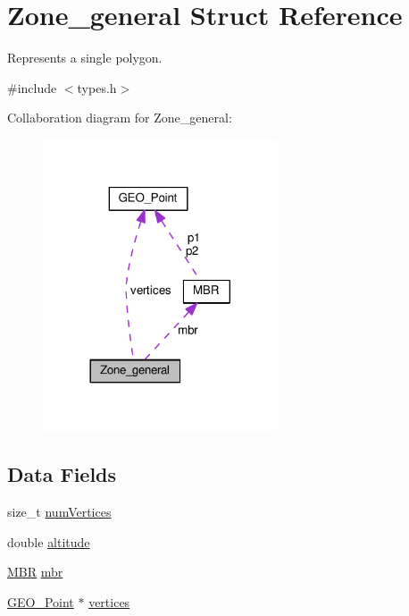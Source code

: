 \hypertarget{struct_zone__general}{}\section{Zone\+\_\+general Struct Reference}
\label{struct_zone__general}


Represents a single polygon.  




{\ttfamily \#include $<$types.\+h$>$}



Collaboration diagram for Zone\+\_\+general\+:
\nopagebreak
\begin{figure}[H]
\begin{center}
\leavevmode
\includegraphics[width=197pt]{struct_zone__general__coll__graph}
\end{center}
\end{figure}
\subsection*{Data Fields}
\begin{DoxyCompactItemize}
\item 
size\+\_\+t \hyperlink{struct_zone__general_a4201b99044782c4891e04f4981f402e9}{num\+Vertices}
\item 
double \hyperlink{struct_zone__general_a2b13d276aee0d9fd646c8fa3647e869b}{altitude}
\item 
\hyperlink{struct_m_b_r}{M\+BR} \hyperlink{struct_zone__general_a5704de758d5631f53b2bb724b152f40b}{mbr}
\item 
\hyperlink{struct_g_e_o___point}{G\+E\+O\+\_\+\+Point} $\ast$ \hyperlink{struct_zone__general_acc847332c99d5cd8e044760a5c04fa1f}{vertices}
\end{DoxyCompactItemize}


